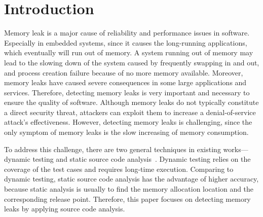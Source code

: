 \section{Introduction}\label{sec:intro}
Memory leak is a major cause of reliability and performance issues in software. Especially in embedded systems, since it causes the long-running applications, which eventually will run out of memory. 
A system running out of memory may lead to the slowing down of the system caused by frequently swapping in and out, and process creation failure because of no more memory available. Moreover, memory leaks have caused severe consequences in some large applications and services. 
Therefore, detecting memory leaks is very important and necessary to ensure the quality of software. Although memory leaks do not typically constitute a direct security threat, attackers can exploit them to increase a denial-of-service attack’s effectiveness.
However, detecting memory leaks is challenging, since the only symptom of memory leaks is the slow increasing of memory consumption.  

To address this challenge, there are two general techniques in existing works---dynamic testing and static source code analysis~\cite{AJ06}. 
Dynamic testing relies on the coverage of the test cases and requires long-time execution. Comparing to dynamic testing, static source code analysis has the advantage of higher accuracy, because static analysis is usually to find the memory allocation location and the corresponding release point.
Therefore, this paper focuses on detecting memory leaks by applying source code analysis.

